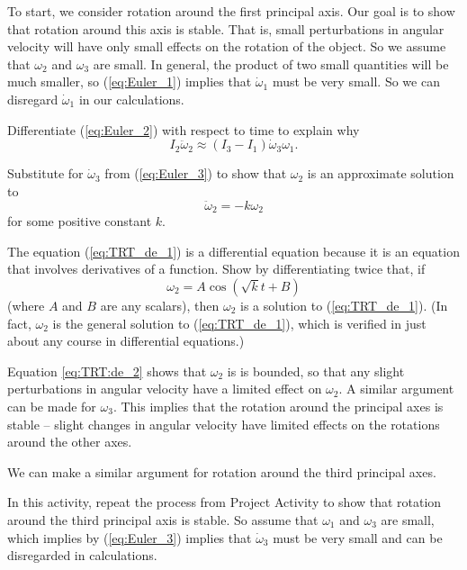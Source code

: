 \begin{pactivity} \label{act:TRT_axes1} To start, we consider rotation around the first principal axis. Our goal is to show that rotation around this axis is stable. That is, small perturbations in angular velocity will have only small effects on the rotation of the object. So we assume that $\omega_2$ and $\omega_3$ are small. In general, the product of two small quantities will be much smaller, so (\ref{eq:Euler_1}) implies that $\dot{\omega}_1$ must be very small. So we can disregard $\dot{\omega}_1$ in our calculations. 
\ba
\item Differentiate (\ref{eq:Euler_2}) with respect to time to explain why 
\[I_2 \ddot{\omega}_2 \approx (I_3-I_1)  \dot{\omega}_3 \omega_1.\]
	
\item Substitute for $\dot{\omega}_3$ from (\ref{eq:Euler_3}) to show that $\omega_2$ is an approximate solution to 
\begin{equation} \label{eq:TRT_de_1}
\ddot{\omega}_2 = -k \omega_2
\end{equation}
for some positive constant $k$.

\item The equation (\ref{eq:TRT_de_1}) is a differential equation because it is an equation that involves derivatives of a function. Show by differentiating twice that, if 
\begin{equation} \label{eq:TRT:de_2}
\omega_2 = A\cos\left(\sqrt{k}t + B\right)
\end{equation} 
(where $A$ and $B$ are any scalars), then $\omega_2$ is a solution to (\ref{eq:TRT_de_1}). (In fact, $\omega_2$ is the general solution to (\ref{eq:TRT_de_1}), which is verified in just about any course in differential equations.)

\ea

\end{pactivity}

Equation \ref{eq:TRT:de_2} shows that $\omega_2$ is is bounded, so that any slight perturbations in angular velocity have a limited effect on $\omega_2$. A similar argument can be made for $\omega_3$. This implies that the rotation around the principal axes is stable -- slight changes in angular velocity have limited effects on the rotations around the other axes. 

We can make a similar argument for rotation around the third principal axes.

\begin{pactivity} \label{act:TRT_axes3} In this activity, repeat the process from Project Activity \label{act:TRT_axes1} to show that rotation around the third principal axis is stable. So  assume that $\omega_1$ and $\omega_3$ are small, which implies by (\ref{eq:Euler_3}) implies that $\dot{\omega}_3$ must be very small and can be disregarded in calculations. 

\end{pactivity}

